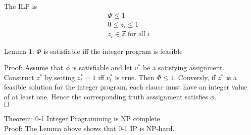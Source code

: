 \documentclass[mathserif]{beamer}
\renewcommand{\qed}{\hfill\square}
\begin{document}
\begin{frame}
The ILP is
\begin{align*}
\Phi \leq 1\\
0 \leq z_i \leq 1\\
z_i \in \mathbb{Z}\ \text{for all}\ i
\end{align*}

Lemma 1: $\Phi$ is satisfiable iff the integer program is feasible
\end{frame}

\begin{frame}
Proof: Assume that $\phi$ is satisfiable and let $v^*$ be a satisfying
assignment. Construct $z^*$ by setting $z^*_i = 1$ iff $v^*_i$ is true. Then
$\Phi \leq 1$.
Conversly, if $z^*$ is a feasible solution for the integer program, each clause
must have an integer value of at least one. Hence the corresponding truth
asssignment satisfies $\phi$.\\
$\qed$

Theorem: 0-1 Integer Programming is NP complete\\

Proof: The Lemma above shows that 0-1 IP is NP-hard. 
\end{frame}
\end{document}

